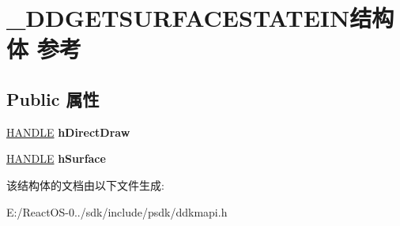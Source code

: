 \hypertarget{struct___d_d_g_e_t_s_u_r_f_a_c_e_s_t_a_t_e_i_n}{}\section{\+\_\+\+D\+D\+G\+E\+T\+S\+U\+R\+F\+A\+C\+E\+S\+T\+A\+T\+E\+I\+N结构体 参考}
\label{struct___d_d_g_e_t_s_u_r_f_a_c_e_s_t_a_t_e_i_n}
\subsection*{Public 属性}
\begin{DoxyCompactItemize}
\item 
\mbox{\label{struct___d_d_g_e_t_s_u_r_f_a_c_e_s_t_a_t_e_i_n_a9490164afa6e545322574e768a27c1e3}} 
\hyperlink{interfacevoid}{H\+A\+N\+D\+LE} {\bfseries h\+Direct\+Draw}
\item 
\mbox{\label{struct___d_d_g_e_t_s_u_r_f_a_c_e_s_t_a_t_e_i_n_a35d5d12d16f8d47062606476769df8e5}} 
\hyperlink{interfacevoid}{H\+A\+N\+D\+LE} {\bfseries h\+Surface}
\end{DoxyCompactItemize}


该结构体的文档由以下文件生成\+:\begin{DoxyCompactItemize}
\item 
E\+:/\+React\+O\+S-\/0../sdk/include/psdk/ddkmapi.\+h\end{DoxyCompactItemize}
